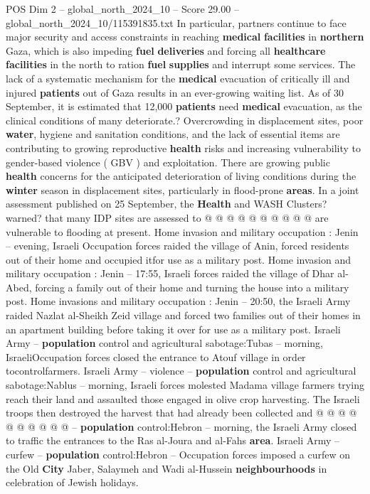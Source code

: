 \begin{textsample}{POS Dim 2 – global\_north\_2024\_10 – Score 29.00 – global\_north\_2024\_10/115391835.txt}
In particular, partners continue to face major security and access constraints in reaching \textbf{medical} \textbf{facilities} in \textbf{northern} Gaza, which is also impeding \textbf{fuel} \textbf{deliveries} and forcing all \textbf{healthcare} \textbf{facilities} in the north to ration \textbf{fuel} \textbf{supplies} and interrupt some services.
The lack of a systematic mechanism for the \textbf{medical} evacuation of critically ill and injured \textbf{patients} out of Gaza results in an ever-growing waiting list.
As of 30 September, it is estimated that 12,000 \textbf{patients} need \textbf{medical} evacuation, as the clinical conditions of many deteriorate.?
Overcrowding in displacement sites, poor \textbf{water}, hygiene and sanitation conditions, and the lack of essential items are contributing to growing reproductive \textbf{health} risks and increasing vulnerability to gender-based violence ( GBV ) and exploitation.
There are growing public \textbf{health} concerns for the anticipated deterioration of living conditions during the \textbf{winter} season in displacement sites, particularly in flood-prone \textbf{areas}.
In a joint assessment published on 25 September, the \textbf{Health} and WASH Clusters? warned? that many IDP sites are assessed to @ @ @ @ @ @ @ @ @ @ are vulnerable to flooding at present.
Home invasion and military occupation : Jenin -- evening, Israeli Occupation forces raided the village of Anin, forced residents out of their home and occupied itfor use as a military post.
Home invasion and military occupation : Jenin -- 17:55, Israeli forces raided the village of Dhar al-Abed, forcing a family out of their home and turning the house into a military post.
Home invasions and military occupation : Jenin -- 20:50, the Israeli Army raided Nazlat al-Sheikh Zeid village and forced two families out of their homes in an apartment building before taking it over for use as a military post.
Israeli Army -- \textbf{population} control and agricultural sabotage:Tubas -- morning, IsraeliOccupation forces closed the entrance to Atouf village in order tocontrolfarmers.
Israeli Army -- violence -- \textbf{population} control and agricultural sabotage:Nablus -- morning, Israeli forces molested Madama village farmers trying reach their land and assaulted those engaged in olive crop harvesting.
The Israeli troops then destroyed the harvest that had already been collected and @ @ @ @ @ @ @ @ @ @ -- \textbf{population} control:Hebron -- morning, the Israeli Army closed to traffic the entrances to the Ras al-Joura and al-Fahs \textbf{area}.
Israeli Army -- curfew -- \textbf{population} control:Hebron -- Occupation forces imposed a curfew on the Old \textbf{City} Jaber, Salaymeh and Wadi al-Hussein \textbf{neighbourhoods} in celebration of Jewish holidays.

\end{textsample}
